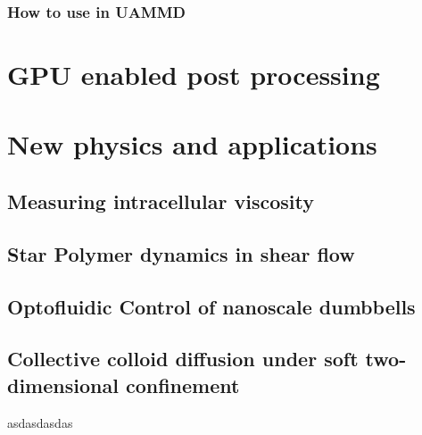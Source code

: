 \documentclass[ twoside,openright,titlepage,numbers=noenddot,%
headinclude,footinclude,cleardoublepage=empty,abstract=on,
BCOR=5mm,paper=a4,fontsize=11pt, dvipsnames
]{scrreprt}
\begin{document}
\section{How to use in UAMMD}


\newpage
\cleardoublepage
{}
\part{GPU enabled post processing}\label{pt:tools}


\newpage
\cleardoublepage
\part{New physics and applications}\label{pt:applications}
\chapter{Measuring intracellular viscosity}
\chapter{Star Polymer dynamics in shear flow}
\chapter{Optofluidic Control of nanoscale dumbbells}
\chapter{Collective colloid diffusion under soft two-dimensional confinement}

asdasdasdas
\newpage


\appendix
%

\cleardoublepage
\cleardoublepage
\cleardoublepage
\newpage
\end{document}
